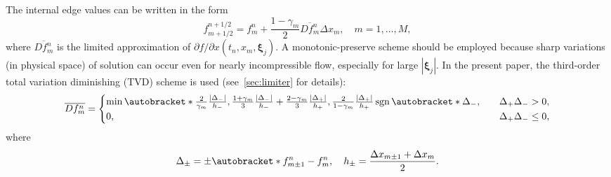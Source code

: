 \documentclass{elsarticle} %
\newcommand{\Pder}[2][]{\partial#1/\partial#2}
\DeclarePairedDelimiter\autobracket()       %
\newcommand{\br}[1]{\autobracket*{#1}}
\DeclareMathOperator{\sgn}{sgn}
\newcommand{\bxi}{\boldsymbol{\xi}}
\begin{document}
The internal edge values can be written in the form
\begin{equation}\label{eq:internal_fluxes}
    f^{n+1/2}_{m+1/2} = f^n_m + \frac{1-\gamma_m}2\overline{Df^n_m}\Delta{x_m},
    \quad m = 1,\dots,M,
\end{equation}
where \(\overline{Df^n_m}\) is the limited approximation of \(\Pder[f]{x}(t_n, x_m, \bxi_j)\).
A monotonic-preserve scheme should be employed because sharp variations (in physical space)
of solution can occur even for nearly incompressible flow, especially for large \(|\bxi_j|\).
In the present paper, the third-order total variation diminishing (TVD) scheme is used
(see~\ref{sec:limiter} for details):
\begin{equation}\label{eq:limiter}
    \overline{Df^n_m} = \begin{cases}
        \min\br{
             \frac2{\gamma_m}\frac{|\Delta_-|}{h_-},
             \frac{1+\gamma_m}3\frac{|\Delta_-|}{h_-} + \frac{2-\gamma_m}3\frac{|\Delta_+|}{h_+},
             \frac2{1-\gamma_m}\frac{|\Delta_+|}{h_+}
        }\sgn\br{\Delta_-}, &\quad \Delta_+\Delta_- > 0, \\
        0, &\quad \Delta_+\Delta_- \leq 0,
    \end{cases}
\end{equation}
where
\begin{equation}\label{eq:differences}
    \Delta_\pm = \pm\br{f_{m\pm1}^n - f_m^n}, \quad h_\pm = \frac{\Delta{x_{m\pm1}} + \Delta{x_m}}2.
\end{equation}
\end{document}
